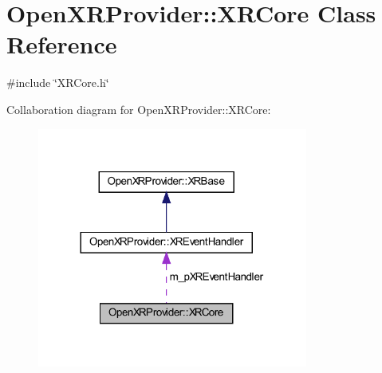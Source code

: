 \hypertarget{class_open_x_r_provider_1_1_x_r_core}{}\section{Open\+X\+R\+Provider\+::X\+R\+Core Class Reference}
\label{class_open_x_r_provider_1_1_x_r_core}


{\ttfamily \#include \char`\"{}X\+R\+Core.\+h\char`\"{}}



Collaboration diagram for Open\+X\+R\+Provider\+::X\+R\+Core\+:
\nopagebreak
\begin{figure}[H]
\begin{center}
\leavevmode
\includegraphics[width=252pt]{class_open_x_r_provider_1_1_x_r_core__coll__graph}
\end{center}
\end{figure}
